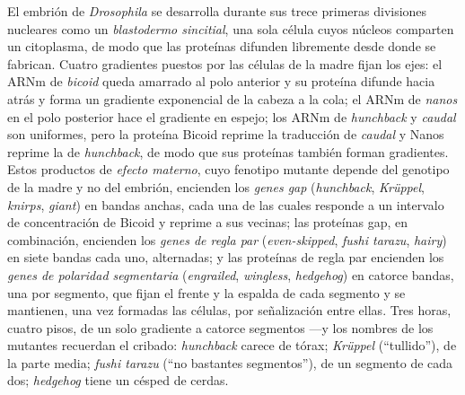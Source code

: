 \begin{definition}\label{def:b3:developmental-genetics:hierarchy}
El embrión de \emph{Drosophila} se desarrolla durante sus trece
primeras divisiones nucleares como un \emph{blastodermo sincitial}, una
sola célula cuyos núcleos comparten un citoplasma, de modo que las
proteínas difunden libremente desde donde se fabrican. Cuatro
gradientes puestos por las células de la madre fijan los ejes: el ARNm
de \emph{bicoid} queda amarrado al polo anterior y su proteína difunde
hacia atrás y forma un gradiente exponencial de la cabeza a la cola; el
ARNm de \emph{nanos} en el polo posterior hace el gradiente en espejo;
los ARNm de \emph{hunchback} y \emph{caudal} son uniformes, pero la
proteína Bicoid reprime la traducción de \emph{caudal} y Nanos reprime
la de \emph{hunchback}, de modo que sus proteínas también forman
gradientes. Estos productos de \emph{efecto materno}, cuyo fenotipo
mutante depende del genotipo de la madre y no del embrión, encienden
los \emph{genes gap} (\emph{hunchback}, \emph{Krüppel},
\emph{knirps}, \emph{giant}) en bandas anchas, cada una de las cuales
responde a un intervalo de concentración de Bicoid y reprime a sus
vecinas; las proteínas gap, en combinación, encienden los \emph{genes
de regla par} (\emph{even-skipped}, \emph{fushi tarazu}, \emph{hairy})
en siete bandas cada uno, alternadas; y las proteínas de regla par
encienden los \emph{genes de polaridad segmentaria}
(\emph{engrailed}, \emph{wingless}, \emph{hedgehog}) en catorce bandas,
una por segmento, que fijan el frente y la espalda de cada segmento y
se mantienen, una vez formadas las células, por señalización entre
ellas. Tres horas, cuatro pisos, de un solo gradiente a catorce
segmentos ---y los nombres de los mutantes recuerdan el cribado:
\emph{hunchback} carece de tórax; \emph{Krüppel} (``tullido''), de la
parte media; \emph{fushi tarazu} (``no bastantes segmentos''), de un
segmento de cada dos; \emph{hedgehog} tiene un césped de cerdas.
\end{definition}


